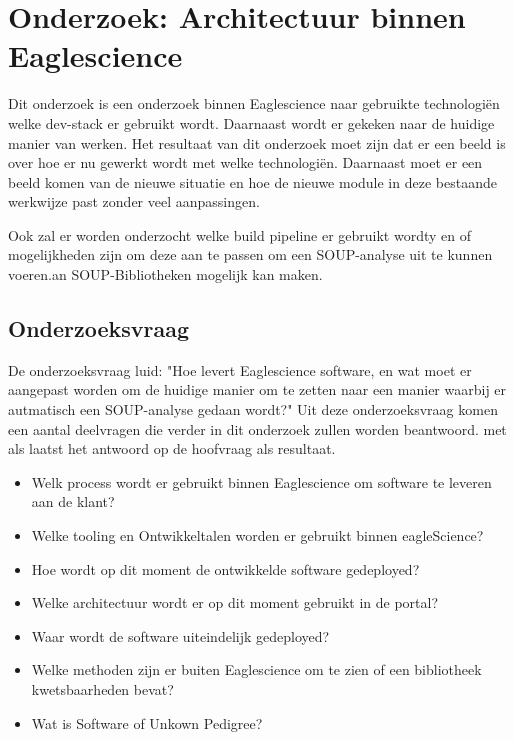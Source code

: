 
\chapter{Onderzoek: Architectuur binnen Eaglescience} %

\label{OnderzoekArchituur} %
Dit onderzoek is een onderzoek binnen Eaglescience naar gebruikte technologi\"en welke dev-stack er gebruikt wordt. Daarnaast wordt er gekeken naar de huidige manier van werken. Het resultaat van dit onderzoek moet zijn dat er een beeld is over hoe er nu gewerkt wordt met welke technologi\"en. Daarnaast moet er een beeld komen van de nieuwe situatie en hoe de nieuwe module in deze bestaande werkwijze past zonder veel aanpassingen.

Ook zal er worden onderzocht welke build pipeline er gebruikt wordty en of mogelijkheden zijn om deze aan te passen om een SOUP-analyse uit te kunnen voeren.an SOUP-Bibliotheken mogelijk kan maken.
\section{Onderzoeksvraag}
De onderzoeksvraag luid: "Hoe levert Eaglescience software, en wat moet er aangepast worden om de huidige manier om te zetten naar een manier waarbij er autmatisch een SOUP-analyse gedaan wordt?" Uit deze onderzoeksvraag komen een aantal deelvragen die verder in dit onderzoek zullen worden beantwoord. met als laatst het antwoord op de hoofvraag als resultaat.

\begin{itemize}
  \item Welk process wordt er gebruikt binnen Eaglescience om software te leveren aan de klant?
  \item Welke tooling en Ontwikkeltalen worden er gebruikt binnen eagleScience?
  \item Hoe wordt op dit moment de ontwikkelde software gedeployed?
  \item Welke architectuur wordt er op dit moment gebruikt in de portal?
  \item Waar wordt de software uiteindelijk gedeployed?
  \item Welke methoden zijn er buiten Eaglescience om te zien of een bibliotheek kwetsbaarheden bevat?
  \item Wat is Software of Unkown Pedigree?
\end{itemize}

